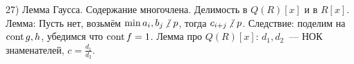 27) Лемма Гаусса. Содержание многочлена. Делимость в $Q(R)[x]$ и в $R[x]$.\\

Лемма: Пусть нет, возьмём $\min a_i, b_j \ndi p$, тогда $c_{i + j} \ndi p$. Следствие: поделим на $\operatorname{cont} g, h$, убедимся что $\operatorname{cont} f = 1$. Лемма про $Q(R)[x]$: $d_1, d_2$~--- НОК знаменателей, $c = \frac{d_1}{d_2}$.\\
